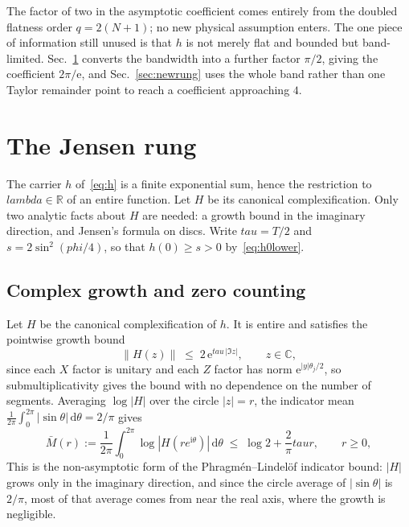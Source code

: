 \documentclass[%
  aps,
  pra,
  preprint,
  superscriptaddress,
  amsmath,amssymb,
  nofootinbib,
  floatfix,
]{revtex4-2}
\def\lambda{lambda}\def\tau{tau}\def\phi{phi}\def\alpha{alpha}%
\theoremstyle{definition}
\theoremstyle{remark}
\newcommand{\C}{\mathbb C}
\newcommand{\R}{\mathbb R}
\newcommand{\tauvar}{\tau}
\begin{document}
The factor of two in the asymptotic coefficient comes entirely from the doubled flatness order
$q=2(N+1)$; no new physical assumption enters. The one piece of information still unused is that
$h$ is not merely flat and bounded but band-limited. Sec.~\ref{sec:jensen} converts the
bandwidth into a further factor $\pi/2$, giving the coefficient $2\pi/\mathrm{e}$, and
Sec.~\ref{sec:newrung} uses the whole band rather than one Taylor remainder point to reach a
coefficient approaching $4$.

\section{The Jensen rung}
\label{sec:jensen}

The carrier $h$ of~\eqref{eq:h} is a finite exponential sum, hence the restriction to
$\lambda\in\R$ of an entire function. Let $H$ be its canonical complexification. Only two
analytic facts about $H$ are needed: a growth bound in the imaginary direction, and Jensen's
formula on discs. Write $\tauvar=T/2$ and $s=2\sin^2(\phi/4)$, so that $h(0)\ge s>0$
by~\eqref{eq:h0lower}.

\subsection{Complex growth and zero counting}

Let $H$ be the canonical complexification of $h$. It is entire and satisfies the pointwise
growth bound
\begin{equation}
\|H(z)\|\;\le\;2\,\mathrm{e}^{\tauvar\,|\Im z|},
\qquad z\in\C,
\label{eq:jgrow}
\end{equation}
since each $X$ factor is unitary and each
$Z$ factor has norm $\mathrm{e}^{|y|\theta_j/2}$, so submultiplicativity gives the bound with no
dependence on the number of segments. Averaging $\log|H|$ over the circle $|z|=r$,
the indicator mean $\frac1{2\pi}\int_0^{2\pi}|\sin\theta|\,\mathrm{d}\theta=2/\pi$ gives
\begin{equation}
\bar M(r)
:=\frac1{2\pi}\int_0^{2\pi}\log|H(re^{\mathrm{i}\theta})|\,\mathrm{d}\theta
\;\le\;\log2+\frac{2}{\pi}\tauvar r,
\qquad r\ge0,
\label{eq:jmean}
\end{equation}
This is the non-asymptotic form of the
Phragm\'en--Lindel\"of indicator bound: $|H|$ grows only in the imaginary direction, and since
the circle average of $|\sin\theta|$ is $2/\pi$, most of that average comes from near the real
axis, where the growth is negligible.
\end{document}
